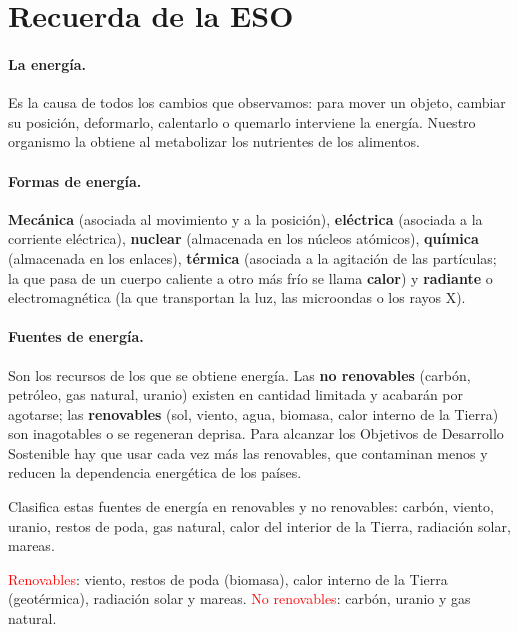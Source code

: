 \section{Recuerda de la ESO}\label{sec:ud12-eso}

\paragraph{La energía.} Es la causa de todos los cambios que observamos: para mover un objeto, cambiar su posición, deformarlo,
calentarlo o quemarlo interviene la energía. Nuestro organismo la obtiene al metabolizar los nutrientes de los alimentos.

\paragraph{Formas de energía.} \textbf{Mecánica} (asociada al movimiento y a la posición), \textbf{eléctrica} (asociada a la corriente
eléctrica), \textbf{nuclear} (almacenada en los núcleos atómicos), \textbf{química} (almacenada en los enlaces), \textbf{térmica}
(asociada a la agitación de las partículas; la que pasa de un cuerpo caliente a otro más frío se llama \textbf{calor}) y
\textbf{radiante} o electromagnética (la que transportan la luz, las microondas o los rayos X).

\paragraph{Fuentes de energía.} Son los recursos de los que se obtiene energía. Las \textbf{no renovables} (carbón, petróleo, gas
natural, uranio) existen en cantidad limitada y acabarán por agotarse; las \textbf{renovables} (sol, viento, agua, biomasa, calor
interno de la Tierra) son inagotables o se regeneran deprisa. Para alcanzar los Objetivos de Desarrollo Sostenible hay que usar cada
vez más las renovables, que contaminan menos y reducen la dependencia energética de los países.

\begin{exercise}
    Clasifica estas fuentes de energía en renovables y no renovables: carbón, viento, uranio, restos de poda, gas natural, calor del
    interior de la Tierra, radiación solar, mareas.
    \begin{solu}
        \textcolor{red}{Renovables}: viento, restos de poda (biomasa), calor interno de la Tierra (geotérmica), radiación solar y mareas.
        \textcolor{red}{No renovables}: carbón, uranio y gas natural.
    \end{solu}
\end{exercise}

